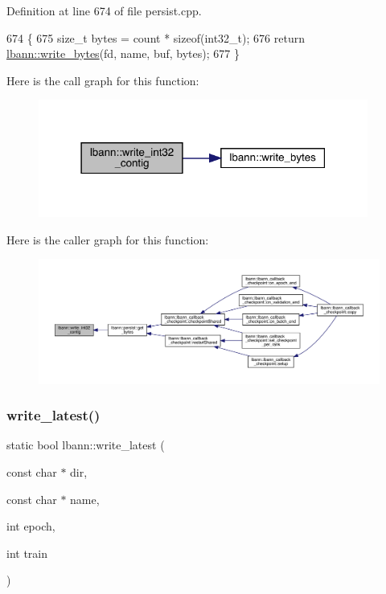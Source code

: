 Definition at line 674 of file persist.\+cpp.


\begin{DoxyCode}
674                                                                                            \{
675   \textcolor{keywordtype}{size\_t} bytes = count * \textcolor{keyword}{sizeof}(int32\_t);
676   \textcolor{keywordflow}{return} \hyperlink{namespacelbann_aed95061796f19fa1648dcc99dc335abd}{lbann::write\_bytes}(fd, name, buf, bytes);
677 \}
\end{DoxyCode}
Here is the call graph for this function\+:\nopagebreak
\begin{figure}[H]
\begin{center}
\leavevmode
\includegraphics[width=307pt]{namespacelbann_a917727ad7e4f0dfd6d5a609cdc6dd9e2_cgraph}
\end{center}
\end{figure}
Here is the caller graph for this function\+:\nopagebreak
\begin{figure}[H]
\begin{center}
\leavevmode
\includegraphics[width=350pt]{namespacelbann_a917727ad7e4f0dfd6d5a609cdc6dd9e2_icgraph}
\end{center}
\end{figure}
\mbox{\label{namespacelbann_a35a39e949cfd1d7f8c15f94e4d44ecff}} 
\subsubsection{\texorpdfstring{write\+\_\+latest()}{write\_latest()}}
{\footnotesize\ttfamily static bool lbann\+::write\+\_\+latest (\begin{DoxyParamCaption}\item[{const char $\ast$}]{dir,  }\item[{const char $\ast$}]{name,  }\item[{int}]{epoch,  }\item[{int}]{train }\end{DoxyParamCaption})\hspace{0.3cm}{\ttfamily [static]}}



